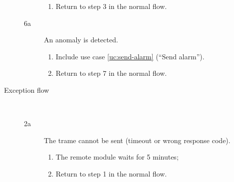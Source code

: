 \begin{description}
\begin{description}
\begin{enumerate}
			\item Return to step 3 in the normal flow.
		\end{enumerate}
		\item[6a] An anomaly is detected.
		\begin{enumerate}
			\item Include use case \ref{uc:send-alarm} (``Send alarm'').
			\item Return to step 7 in the normal flow.  
		\end{enumerate} 
	\end{description}
	\item[Exception flow] \ 
	\begin{description}
		\item[2a] The trame cannot be sent (timeout or wrong response code).
		\begin{enumerate}
			\item The remote module waits for 5 minutes;
			\item Return to step 1 in the normal flow.  
		\end{enumerate}
	\end{description}
\end{description}